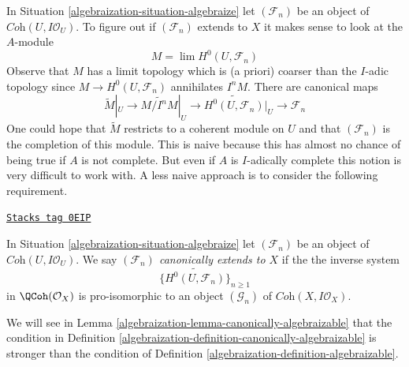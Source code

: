 In Situation \ref{algebraization-situation-algebraize} let $(\mathcal{F}_n)$ be an
object of $\textit{Coh}(U, I\mathcal{O}_U)$. To figure out if
$(\mathcal{F}_n)$ extends to $X$ it makes sense to look at the $A$-module
\begin{equation}
\label{equation-guess}
M = \lim H^0(U, \mathcal{F}_n)
\end{equation}
Observe that $M$ has a limit topology which is (a priori) coarser than
the $I$-adic topology since $M \to H^0(U, \mathcal{F}_n)$ annihilates $I^nM$.
There are canonical maps
$$
\widetilde{M}|_U \to \widetilde{M/I^nM}|_U \to
\widetilde{H^0(U, \mathcal{F}_n)}|_U \to
\mathcal{F}_n
$$
One could hope that $\widetilde{M}$ restricts to a coherent module
on $U$ and that $(\mathcal{F}_n)$ is the completion of this module.
This is naive because this has almost no chance of being true
if $A$ is not complete. But even if $A$ is $I$-adically complete
this notion is very difficult to work with.
A less naive approach is to consider the following requirement.

\begin{definition}
\label{algebraization-definition-canonically-algebraizable}
\href{https://stacks.math.columbia.edu/tag/0EIP}{\texttt{Stacks tag 0EIP}}

In Situation \ref{algebraization-situation-algebraize} let $(\mathcal{F}_n)$ be an
object of $\textit{Coh}(U, I\mathcal{O}_U)$. We say
{\it $(\mathcal{F}_n)$ canonically extends to $X$} if the the
inverse system
$$
\{\widetilde{H^0(U, \mathcal{F}_n)}\}_{n \geq 1}
$$
in $\QCoh(\mathcal{O}_X)$ is pro-isomorphic to an object
$(\mathcal{G}_n)$ of $\textit{Coh}(X, I\mathcal{O}_X)$.
\end{definition}

We will see in Lemma \ref{algebraization-lemma-canonically-algebraizable}
that the condition in Definition \ref{algebraization-definition-canonically-algebraizable}
is stronger than the condition of Definition \ref{algebraization-definition-algebraizable}.

